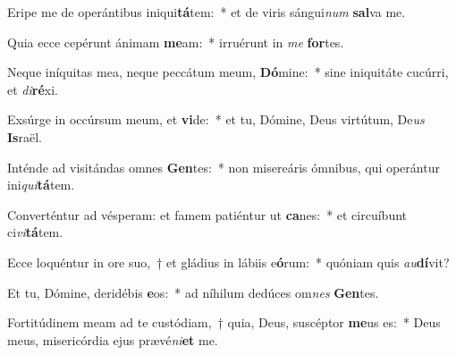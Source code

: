 \item Eripe me de operántibus iniqui\textbf{tá}tem:~* et de viris sángui\textit{num} \textbf{sal}va me.
\item Quia ecce cepérunt ánimam \textbf{me}am:~* irruérunt in \textit{me} \textbf{for}tes.
\item Neque iníquitas mea, neque peccátum meum, \textbf{Dó}mine:~* sine iniquitáte cucúrri, et \textit{di}\textbf{ré}xi.
\item Exsúrge in occúrsum meum, et \textbf{vi}de:~* et tu, Dómine, Deus virtútum, De\textit{us} \textbf{Is}raël.
\item Inténde ad visitándas omnes \textbf{Gen}tes:~* non misereáris ómnibus, qui operántur ini\textit{qui}\textbf{tá}tem.
\item Converténtur ad vésperam: et famem patiéntur ut \textbf{ca}nes:~* et circuíbunt ci\textit{vi}\textbf{tá}tem.
\item Ecce loquéntur in ore suo,~† et gládius in lábiis e\textbf{ó}rum:~* quóniam quis \textit{au}\textbf{dí}vit?
\item Et tu, Dómine, deridébis \textbf{e}os:~* ad níhilum dedúces om\textit{nes} \textbf{Gen}tes.
\item Fortitúdinem meam ad te custódiam,~† quia, Deus, suscéptor \textbf{me}us es:~* Deus meus, misericórdia ejus prævé\textit{ni}\textbf{et} me.
